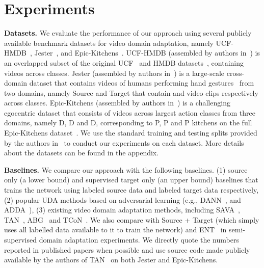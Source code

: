 \vspace{-2mm}
\section{Experiments}
\label{sec:experiments}
\vspace{-1mm}

\textbf{Datasets.} We evaluate the performance of our approach using several publicly available benchmark datasets for video domain adaptation, namely UCF-HMDB~\cite{chen2019domain}, Jester~\cite{pan2020adversarial}, and Epic-Kitchens~\cite{munro2020multi}. UCF-HMDB (assembled by authors in~\cite{chen2019domain}) is an overlapped subset of the original UCF~\cite{soomro2012ucf101} and HMDB datasets~\cite{kuehne2011hmdb}, containing  videos across  classes. 
Jester (assembled by authors in~\cite{pan2020adversarial}) is a large-scale cross-domain dataset that contains videos of humans performing hand gestures~\cite{materzynska2019jester} from two domains, namely Source and Target that contain  and  video clips respectively across  classes.
Epic-Kitchens (assembled by authors in~\cite{munro2020multi}) is a challenging egocentric dataset that consists of videos across  largest action classes from three domains, namely D, D and D, corresponding to P, P and P kitchens on the full Epic-Kitchens dataset~\cite{damen2018scaling}.
We use the standard training and testing splits provided by the authors in~\cite{chen2019domain,pan2020adversarial,munro2020multi} to conduct our experiments on each dataset.
More details about the datasets can be found in the appendix.

\textbf{Baselines.} We compare our approach with the following baselines. (1) source only (a lower bound) and supervised target only (an upper bound) baselines that trains the network using labeled source data and labeled target data respectively, (2) popular UDA methods based on adversarial learning (e.g., DANN~\cite{ganin2016domain}, and ADDA~\cite{tzeng2017adversarial}), (3) existing video domain adaptation methods, including SAVA~\cite{choi2020shuffle}, TA\textsuperscript{}N~\cite{chen2019temporal}, ABG~\cite{luo2020adversarial} and TCoN~\cite{pan2020adversarial}. We also compare with Source + Target (which simply uses all labelled data available to it to train the network) and ENT~\cite{saito2019semi} in semi-supervised domain adaptation experiments.
We directly quote the numbers reported in published papers when possible and use source code made publicly available by the authors of TA\textsuperscript{}N~\cite{chen2019temporal} on both Jester and Epic-Kitchens.


